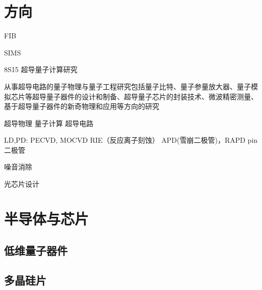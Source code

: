  
\usepackage[a4paper,left=15mm,right=15mm,top=15mm,bottom=15mm]{geometry} %


	
\newpage
	
	\renewcommand{\contentsname}{目录}  %
	\tableofcontents\label{目录}

\section{方向}
FIB

SIMS




8S15 超导量子计算研究

从事超导电路的量子物理与量子工程研究包括量子比特、量子参量放大器、量子模拟芯片等超导量子器件的设计和制备、超导量子芯片的封装技术、微波精密测量、基于超导量子器件的新奇物理和应用等方向的研究

超导物理
量子计算
超导电路

LD,PD:
PECVD, MOCVD
RIE（反应离子刻蚀）
APD(雪崩二极管)，RAPD
pin二极管

噪音消除

光芯片设计

\section{半导体与芯片}

\subsection{低维量子器件}
 

\subsection{多晶硅片}


